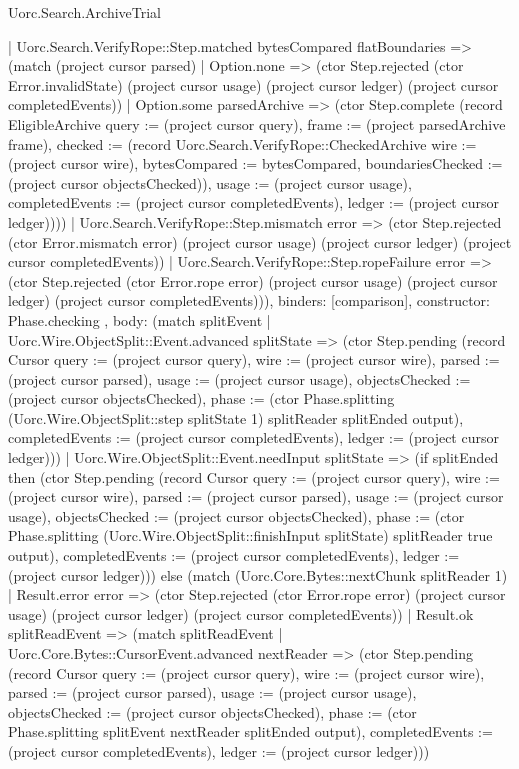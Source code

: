 \begin{lexlean}{Uorc.Search.ArchiveTrial}
\begin{semanticmodule}
{{{          | Uorc.Search.VerifyRope::Step.matched bytesCompared flatBoundaries => (match (project cursor parsed)
            | Option.none => (ctor Step.rejected (ctor Error.invalidState) (project cursor usage) (project cursor ledger) (project cursor completedEvents))
            | Option.some parsedArchive => (ctor Step.complete (record EligibleArchive {query := (project cursor query), frame := (project parsedArchive frame), checked := (record Uorc.Search.VerifyRope::CheckedArchive {wire := (project cursor wire), bytesCompared := bytesCompared, boundariesChecked := (project cursor objectsChecked)}), usage := (project cursor usage), completedEvents := (project cursor completedEvents), ledger := (project cursor ledger)})))
          | Uorc.Search.VerifyRope::Step.mismatch error => (ctor Step.rejected (ctor Error.mismatch error) (project cursor usage) (project cursor ledger) (project cursor completedEvents))
          | Uorc.Search.VerifyRope::Step.ropeFailure error => (ctor Step.rejected (ctor Error.rope error) (project cursor usage) (project cursor ledger) (project cursor completedEvents))),
        binders: [comparison],
        constructor: Phase.checking
      },
      {
        body: (match splitEvent
          | Uorc.Wire.ObjectSplit::Event.advanced splitState => (ctor Step.pending (record Cursor {query := (project cursor query), wire := (project cursor wire), parsed := (project cursor parsed), usage := (project cursor usage), objectsChecked := (project cursor objectsChecked), phase := (ctor Phase.splitting (Uorc.Wire.ObjectSplit::step splitState 1) splitReader splitEnded output), completedEvents := (project cursor completedEvents), ledger := (project cursor ledger)}))
          | Uorc.Wire.ObjectSplit::Event.needInput splitState => (if splitEnded then (ctor Step.pending (record Cursor {query := (project cursor query), wire := (project cursor wire), parsed := (project cursor parsed), usage := (project cursor usage), objectsChecked := (project cursor objectsChecked), phase := (ctor Phase.splitting (Uorc.Wire.ObjectSplit::finishInput splitState) splitReader true output), completedEvents := (project cursor completedEvents), ledger := (project cursor ledger)})) else (match (Uorc.Core.Bytes::nextChunk splitReader 1)
            | Result.error error => (ctor Step.rejected (ctor Error.rope error) (project cursor usage) (project cursor ledger) (project cursor completedEvents))
            | Result.ok splitReadEvent => (match splitReadEvent
              | Uorc.Core.Bytes::CursorEvent.advanced nextReader => (ctor Step.pending (record Cursor {query := (project cursor query), wire := (project cursor wire), parsed := (project cursor parsed), usage := (project cursor usage), objectsChecked := (project cursor objectsChecked), phase := (ctor Phase.splitting splitEvent nextReader splitEnded output), completedEvents := (project cursor completedEvents), ledger := (project cursor ledger)}))
}}}
\end{semanticmodule}
\end{lexlean}
